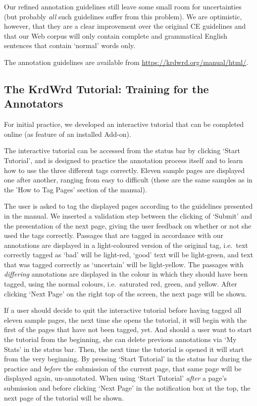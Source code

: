 \begin{longversion}
Our refined annotation guidelines still leave some small room for uncertainties (but probably \textit{all} such guidelines suffer from this problem). 
We are optimistic, however, that they are a clear improvement over the original CE guidelines and that our Web corpus will only contain complete and grammatical English sentences that contain `normal' words only.

\noindent \linebreak
The annotation guidelines are available from \url{https://krdwrd.org/manual/html/}.


\subsection{\label{sec:tutorial}The KrdWrd Tutorial: Training for the Annotators}
For initial practice, we developed an interactive tutorial that can be completed online (as feature of an installed Add-on).

The interactive tutorial can be accessed from the status bar by clicking `Start Tutorial', and is designed to practice the annotation process itself and to learn how to use the three different tags correctly. 
Eleven sample pages are displayed one after another, ranging from easy to difficult (these are the same samples as in the 'How to Tag Pages' section of the manual).

The user is asked to tag the displayed pages according to the guidelines presented in the manual. 
We inserted a validation step between the clicking of `Submit' and the presentation of the next page, giving the user feedback on whether or not she used the tags correctly. 
Passages that are tagged in accordance with our annotations are displayed in a light-coloured version of the original tag, i.e.~text correctly tagged as `bad' will be light-red, `good' text will be light-green, and text that was tagged correctly as `uncertain' will be light-yellow.
The passages with \textit{differing} annotations are displayed in the colour in which they should have been tagged, using the normal colours, i.e.~saturated red, green, and yellow.
After clicking `Next Page' on the right top of the screen, the next page will be shown.

If a user should decide to quit the interactive tutorial before having tagged all eleven sample pages, the next time she opens the tutorial, it will begin with the first of the pages that have not been tagged, yet. 
And should a user want to start the tutorial from the beginning, she can delete previous annotations via `My Stats' in the status bar. 
Then, the next time the tutorial is opened it will start from the very beginning. 
By pressing `Start Tutorial' in the status bar during the practice and \textit{before} the submission of the current page, that same page will be displayed again, un-annotated.
When using `Start Tutorial' \textit{after} a page's submission and before clicking `Next Page' in the notification box at the top, the next page of the tutorial will be shown.


\end{longversion}
